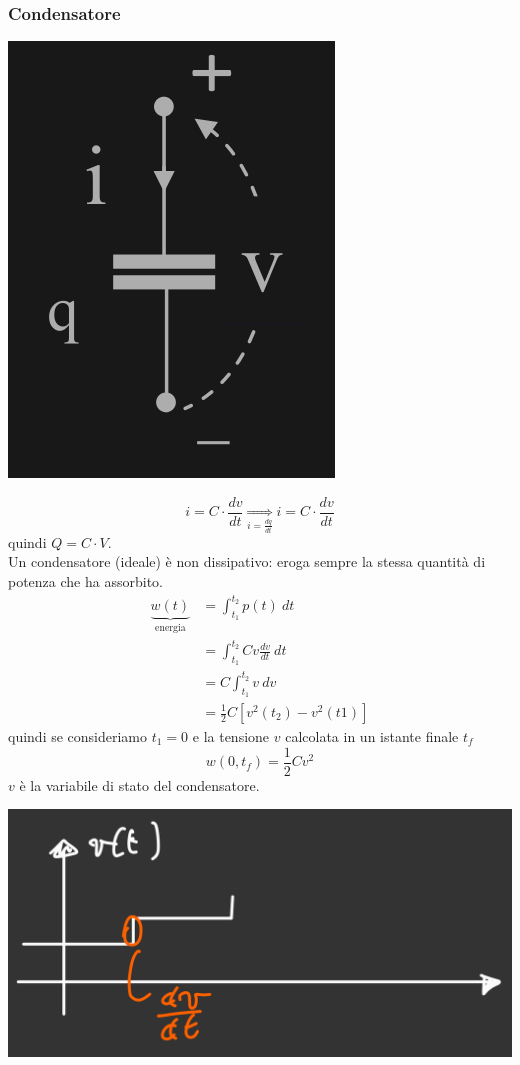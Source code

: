 \documentclass{article}
\begin{document}
\subsubsection{Condensatore}
\begin{center}
    \includegraphics[scale=0.23]{Image/Condensatore.png}
\end{center}
\[
    i = C \cdot \dfrac{dv}{dt} \underset{i=\frac{dq}{dt}}{\Longrightarrow} i = C \cdot \frac{dv}{dt}
\]
quindi $Q = C \cdot V$.\\
Un condensatore (ideale) è non dissipativo: eroga sempre la stessa quantità di potenza che ha assorbito.
\begin{align*}
    \underbrace{w(t)}_{\text{energia}} &= \int_{t_1}^{t_2} p(t) \ dt\\
    &= \int_{t_1}^{t_2} C v  \frac{dv}{dt} \ dt\\
    &= C \int_{t_1}^{t_2} v \ dv\\
    &= \frac{1}{2} C \left[v^2(t_2) - v^2(t1)\right]
\end{align*}
quindi se consideriamo $t_1=0$ e la tensione $v$ calcolata in un istante finale $t_f$
\[
    w(0,t_f) = \frac{1}{2}Cv^2
\]
$v$ è la variabile di stato del condensatore.
\begin{center}
    \includegraphics[scale=0.22]{Image/Grafico condensatore.png}
\end{center}
\end{document}
